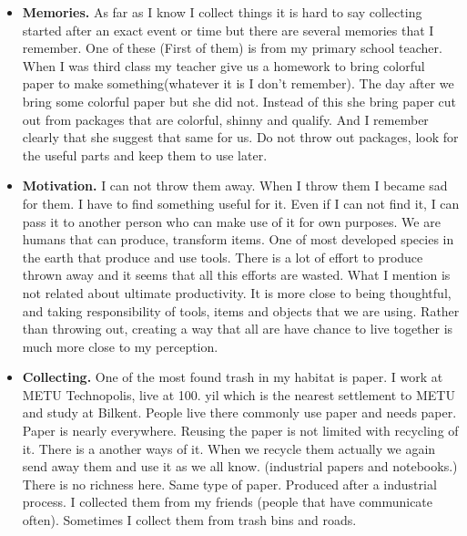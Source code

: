 \begin{itemize}
\item \textbf{Memories.} As far as I know I collect things it is hard to say collecting started after an exact event or time but there are several memories that I remember. One of these (First of them) is from my primary school teacher. When I was third class my teacher give us a homework to bring colorful paper to make something(whatever it is I don't remember). The day after we bring some colorful paper but she did not. Instead of this she bring paper cut out from packages that are colorful, shinny and qualify. And I remember clearly that she suggest that same for us. Do not throw out packages, look for the useful parts and keep them to use later. 
\item \textbf{Motivation.} I can not throw them away. When I throw them I became sad for them. I have to find something useful for it. Even if I can not find it, I can pass it to another person who can make use of it for own purposes. We are humans that can produce, transform items. One of most developed species in the earth that produce and use tools. There is a lot of effort to produce thrown away and it seems that all this efforts are wasted. What I mention is not related about ultimate productivity. It is more close to being thoughtful, and taking responsibility of tools, items and objects that we are using. Rather than throwing out, creating a way that all are have chance to live together is much more close to my perception. 
\item \textbf{Collecting.} One of the most found trash in my habitat is paper. I work at METU Technopolis, live at 100. yil which is the nearest settlement to METU and study at Bilkent. People live there commonly use paper and needs paper. Paper is nearly everywhere. Reusing the paper is not limited with recycling of it. There is a another ways of it. When we recycle them actually we again send away them and use it as we all know. (industrial papers and notebooks.) There is no richness here. Same type of paper. Produced after a industrial process. I collected them from my friends (people that have communicate often). Sometimes I collect them from trash bins and roads. 


\end{itemize}
